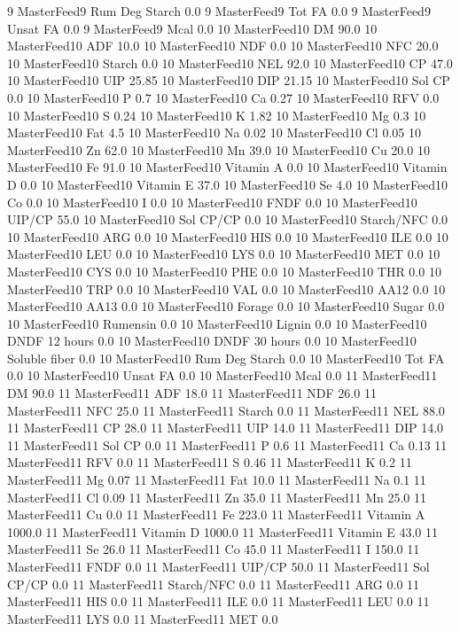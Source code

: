 \documentclass[letterpaper,10pt,english]{sphinxmanual}
\begin{document}
\begin{sphinxVerbatim}[commandchars=\\\{\},numbers=left,firstnumber=1,stepnumber=1]
9 MasterFeed9 Rum Deg Starch 0.0
9 MasterFeed9 Tot FA 0.0
9 MasterFeed9 Unsat FA 0.0
9 MasterFeed9 Mcal 0.0
10 MasterFeed10 DM 90.0
10 MasterFeed10 ADF 10.0
10 MasterFeed10 NDF 0.0
10 MasterFeed10 NFC 20.0
10 MasterFeed10 Starch 0.0
10 MasterFeed10 NEL 92.0
10 MasterFeed10 CP 47.0
10 MasterFeed10 UIP 25.85
10 MasterFeed10 DIP 21.15
10 MasterFeed10 Sol CP 0.0
10 MasterFeed10 P 0.7
10 MasterFeed10 Ca 0.27
10 MasterFeed10 RFV 0.0
10 MasterFeed10 S 0.24
10 MasterFeed10 K 1.82
10 MasterFeed10 Mg 0.3
10 MasterFeed10 Fat 4.5
10 MasterFeed10 Na 0.02
10 MasterFeed10 Cl 0.05
10 MasterFeed10 Zn 62.0
10 MasterFeed10 Mn 39.0
10 MasterFeed10 Cu 20.0
10 MasterFeed10 Fe 91.0
10 MasterFeed10 Vitamin A 0.0
10 MasterFeed10 Vitamin D 0.0
10 MasterFeed10 Vitamin E 37.0
10 MasterFeed10 Se 4.0
10 MasterFeed10 Co 0.0
10 MasterFeed10 I 0.0
10 MasterFeed10 FNDF 0.0
10 MasterFeed10 UIP/CP 55.0
10 MasterFeed10 Sol CP/CP 0.0
10 MasterFeed10 Starch/NFC 0.0
10 MasterFeed10 ARG 0.0
10 MasterFeed10 HIS 0.0
10 MasterFeed10 ILE 0.0
10 MasterFeed10 LEU 0.0
10 MasterFeed10 LYS 0.0
10 MasterFeed10 MET 0.0
10 MasterFeed10 CYS 0.0
10 MasterFeed10 PHE 0.0
10 MasterFeed10 THR 0.0
10 MasterFeed10 TRP 0.0
10 MasterFeed10 VAL 0.0
10 MasterFeed10 AA\PYGZsh{}12 0.0
10 MasterFeed10 AA\PYGZsh{}13 0.0
10 MasterFeed10 \PYGZpc{} Forage 0.0
10 MasterFeed10 Sugar \PYGZpc{} 0.0
10 MasterFeed10 Rumensin 0.0
10 MasterFeed10 Lignin 0.0
10 MasterFeed10 DNDF 12 hours 0.0
10 MasterFeed10 DNDF 30 hours 0.0
10 MasterFeed10 Soluble fiber 0.0
10 MasterFeed10 Rum Deg Starch 0.0
10 MasterFeed10 Tot FA 0.0
10 MasterFeed10 Unsat FA 0.0
10 MasterFeed10 Mcal 0.0
11 MasterFeed11 DM 90.0
11 MasterFeed11 ADF 18.0
11 MasterFeed11 NDF 26.0
11 MasterFeed11 NFC 25.0
11 MasterFeed11 Starch 0.0
11 MasterFeed11 NEL 88.0
11 MasterFeed11 CP 28.0
11 MasterFeed11 UIP 14.0
11 MasterFeed11 DIP 14.0
11 MasterFeed11 Sol CP 0.0
11 MasterFeed11 P 0.6
11 MasterFeed11 Ca 0.13
11 MasterFeed11 RFV 0.0
11 MasterFeed11 S 0.46
11 MasterFeed11 K 0.2
11 MasterFeed11 Mg 0.07
11 MasterFeed11 Fat 10.0
11 MasterFeed11 Na 0.1
11 MasterFeed11 Cl 0.09
11 MasterFeed11 Zn 35.0
11 MasterFeed11 Mn 25.0
11 MasterFeed11 Cu 0.0
11 MasterFeed11 Fe 223.0
11 MasterFeed11 Vitamin A 1000.0
11 MasterFeed11 Vitamin D 1000.0
11 MasterFeed11 Vitamin E 43.0
11 MasterFeed11 Se 26.0
11 MasterFeed11 Co 45.0
11 MasterFeed11 I 150.0
11 MasterFeed11 FNDF 0.0
11 MasterFeed11 UIP/CP 50.0
11 MasterFeed11 Sol CP/CP 0.0
11 MasterFeed11 Starch/NFC 0.0
11 MasterFeed11 ARG 0.0
11 MasterFeed11 HIS 0.0
11 MasterFeed11 ILE 0.0
11 MasterFeed11 LEU 0.0
11 MasterFeed11 LYS 0.0
11 MasterFeed11 MET 0.0

\end{sphinxVerbatim}
\end{document}
